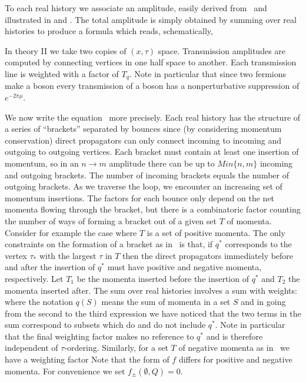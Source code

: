 To each real history we associate an amplitude, easily derived
from \asympi\ and illustrated in
\fig{}
and
\fig{}.
The total amplitude is simply obtained by summing over
real histories to produce a formula which reads, schematically,
\eqn{}
 
In theory II we take two copies of $(x,\tau)$
space. Transmission amplitudes are computed by connecting vertices
in one half space to another. Each transmission line is weighted
with a factor of $T_q$. Note in particular that since two fermions
make a boson every transmission of a boson has a nonperturbative
suppression of $e^{-2\pi \mu}$.
 
 
We now write the equation \radmis\ more precisely. Each real history
has the structure of a series of ``brackets''
\fig{}
separated by bounces since (by considering momentum
conservation) direct propagators can only connect
incoming to incoming and outgoing to outgoing vertices.
Each bracket must contain at least
one insertion of momentum, so in an $n\to m$ amplitude there
can be up to $Min\{n,m\}$ incoming and outgoing brackets.
The number of incoming brackets equals the number of outgoing
brackets. As we traverse the loop,
we encounter an increasing set of
momentum insertions. The factors for each bounce only
depend on the net momenta flowing through the bracket, but
there is a combinatoric factor counting the number
of ways of forming a bracket out of a given set $T$ of
momenta. Consider for example the case where $T$ is a set of
positive momenta. The only constraints on the formation of
a bracket as in \bracket\ is that, if $q^*$ corresponds to
the vertex $\tau_*$ with the largest $\tau$ in $T$ then
the direct propagators immediately before and after the
insertion of $q^*$ must have positive and negative
momenta, respectively. Let $T_1$ be the momenta inserted
before the insertion of $q^*$ and $T_2$ the momenta inserted
after. The sum over real histories involves a
sum with weights:
\eqn{}
where the notation $q(S)$ means the sum of momenta in a set
$S$ and in going from the second to the third expression
we have noticed that the two terms in
the sum correspond to subsets which do and do not include $q^*$.
Note in particular that the final weighting factor makes no reference
to $q^*$ and is therefore independent of $\tau$-ordering.
Similarly, for a set $T$ of negative momenta as in \bracket\ we have
a weighting factor
\eqn{}
Note that the form of $f$ differs for positive and negative momenta.
For convenience we set $f_{\pm}(\emptyset,Q)=0$.
 
